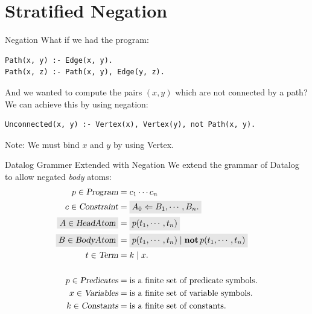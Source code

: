 \section{Stratified Negation}

\begin{frame}[fragile]{Negation}
What if we had the program:

\begin{lstlisting}[language=flix,xleftmargin=0.8cm]
Path(x, y) :- Edge(x, y).
Path(x, z) :- Path(x, y), Edge(y, z).
\end{lstlisting}

\pause

And we wanted to compute the pairs $(x, y)$ which are not connected by a path?
We can achieve this by using negation:

\begin{lstlisting}[language=flix,xleftmargin=0.8cm]
Unconnected(x, y) :- Vertex(x), Vertex(y), not Path(x, y).
\end{lstlisting}

Note: We must bind $x$ and $y$ by using \textsf{Vertex}.
\end{frame}

\begin{frame}{Datalog Grammer Extended with Negation}
We extend the grammar of Datalog to allow negated \emph{body} atoms:
{
\large
\begin{align*}
p \in \textsl{Program}      &= c_1 \cdots c_n \\
c \in \textsl{Constraint}   &= \Highlight{A_0 \Leftarrow B_1, \cdots, B_n.} \\ 
\Highlight{A \in \textsl{HeadAtom}}     &= \Highlight{p(t_1, \cdots, t_n)} \\
\Highlight{B \in \textsl{BodyAtom}}     &= \Highlight{p(t_1, \cdots, t_n) \mid \text{\textbf{not}} \, p(t_1, \cdots, t_n)} \\
t \in \textsl{Term}         &= k \mid x. \\
\\
p \in \textsl{Predicates}   & = \text{is a finite set of predicate symbols.} \\
x \in \textsl{Variables}    & = \text{is a finite set of variable symbols.} \\
k \in \textsl{Constants}    & = \text{is a finite set of constants.}
\end{align*}
}
\end{frame}

